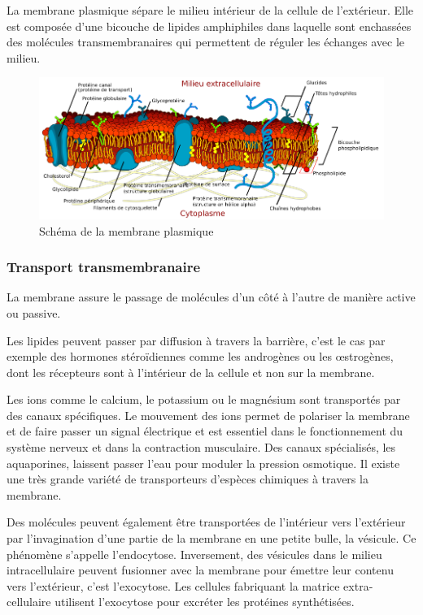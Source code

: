 La membrane plasmique sépare le milieu intérieur de la cellule de l'extérieur. Elle est composée d'une bicouche de lipides amphiphiles dans laquelle sont enchassées des molécules transmembranaires qui permettent de réguler les échanges avec le milieu. 

\begin{figure}[h!]
\includegraphics[scale=0.5]{Cell_membrane_detailed_diagram_fr.png}
\caption{Schéma de la membrane plasmique}
\end{figure}
\subsubsection{Transport transmembranaire}
La membrane assure le passage de molécules d'un côté à l'autre de manière active ou passive. 

Les lipides peuvent passer par diffusion à travers la barrière, c'est le cas par exemple des hormones stéroïdiennes comme les androgènes ou les \oe strogènes, dont les récepteurs sont à l'intérieur de la cellule et non sur la membrane.

Les ions comme le calcium, le potassium ou le magnésium sont transportés par des canaux spécifiques. Le mouvement des ions permet de polariser la membrane et de faire passer un signal électrique et est essentiel dans le fonctionnement du système nerveux et dans la contraction musculaire. Des canaux spécialisés, les aquaporines, laissent passer l'eau pour moduler la pression osmotique. Il existe une très grande variété de transporteurs d'espèces chimiques à travers la membrane. 

Des molécules peuvent également être transportées de l'intérieur vers l'extérieur par l'invagination d'une partie de la membrane en une petite bulle, la vésicule. Ce phénomène s'appelle l'endocytose. Inversement, des vésicules dans le milieu intracellulaire peuvent fusionner avec la membrane pour émettre leur contenu vers l'extérieur, c'est l'exocytose. Les cellules fabriquant la matrice extra-cellulaire utilisent l'exocytose pour excréter les protéines synthétisées. 

